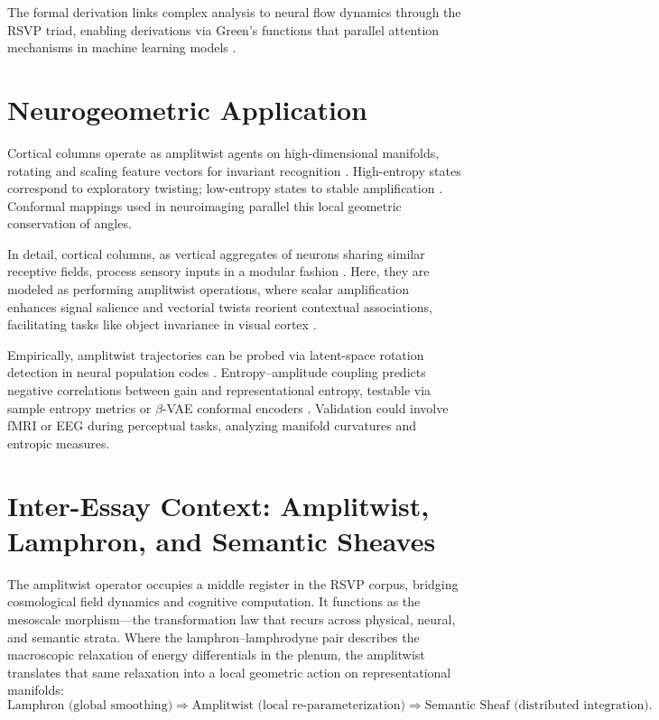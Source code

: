 \documentclass[11pt]{article}
\begin{document}
The formal derivation links complex analysis to neural flow dynamics through the RSVP triad, enabling derivations via Green's functions that parallel attention mechanisms in machine learning models \citep{vaswani2017attention}.

\section{Neurogeometric Application}
Cortical columns operate as amplitwist agents on high-dimensional manifolds, rotating and scaling feature vectors for invariant recognition \citep{mountcastle1957modality,schwartz1980visual}. High-entropy states correspond to exploratory twisting; low-entropy states to stable amplification \citep{carhart2014entropic}. Conformal mappings used in neuroimaging \citep{gu2004genus,wang2007brain} parallel this local geometric conservation of angles.

In detail, cortical columns, as vertical aggregates of neurons sharing similar receptive fields, process sensory inputs in a modular fashion \citep{horton2005cortical}. Here, they are modeled as performing amplitwist operations, where scalar amplification enhances signal salience and vectorial twists reorient contextual associations, facilitating tasks like object invariance in visual cortex \citep{schwartz1980visual}.

Empirically, amplitwist trajectories can be probed via latent-space rotation detection in neural population codes \citep{di2015neural}. Entropy--amplitude coupling predicts negative correlations between gain and representational entropy, testable via sample entropy metrics \citep{richman2000physiological} or $\beta$-VAE conformal encoders \citep{higgins2017beta}. Validation could involve fMRI or EEG during perceptual tasks, analyzing manifold curvatures and entropic measures.

\section{Inter-Essay Context: Amplitwist, Lamphron, and Semantic Sheaves}
The amplitwist operator occupies a middle register in the RSVP corpus, bridging cosmological field dynamics and cognitive computation. It functions as the mesoscale morphism---the transformation law that recurs across physical, neural, and semantic strata. Where the lamphron--lamphrodyne pair describes the macroscopic relaxation of energy differentials in the plenum, the amplitwist translates that same relaxation into a local geometric action on representational manifolds:
\[
\text{Lamphron (global smoothing)} \Rightarrow \text{Amplitwist (local re-parameterization)} \Rightarrow \text{Semantic Sheaf (distributed integration)}.
\]
\end{document}
